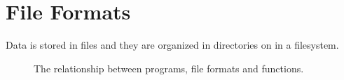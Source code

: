 \section{File Formats}

Data is stored in files and they are organized in directories on in a filesystem. 

\begin{figure}[tbp]
  
  \caption{The relationship between programs, file formats and functions.}
  \label{fig:bg:fileformats}
\end{figure}
